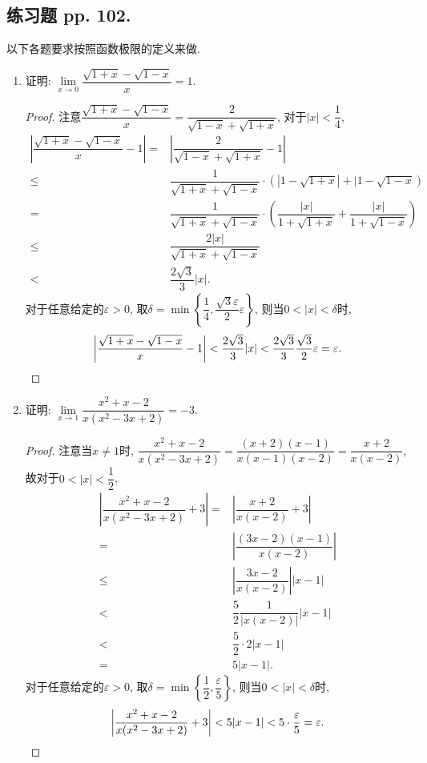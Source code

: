 \documentclass[a4paper,11pt,twoside]{ctexbook}
\begin{document}
\subsection{练习题 pp. 102.}
以下各题要求按照函数极限的定义来做.
\begin{enumerate}
	\item 证明: $\lim\limits_{x\to 0} \dfrac{\sqrt{1+x}-\sqrt{1-x}}{x}=1$.
	      \begin{proof}
		      注意$\dfrac{\sqrt{1+x}-\sqrt{1-x}}{x}=\dfrac{2}{\sqrt{1-x}+\sqrt{1+x}}$, 对于$|x|<\dfrac{1}{4}$,
		      \[
			      \begin{split}
				      \left| \dfrac{\sqrt{1+x}-\sqrt{1-x}}{x}-1\right|=&\left|\dfrac{2}{\sqrt{1-x}+\sqrt{1+x}}-1\right|\\
				      \leqslant&\dfrac{1}{\sqrt{1+x}+\sqrt{1-x}}\cdot(|1-\sqrt{1+x}|+|1-\sqrt{1-x})\\
				      =&\dfrac{1}{\sqrt{1+x}+\sqrt{1-x}}\cdot\left(\dfrac{|x|}{1+\sqrt{1+x}}+\dfrac{|x|}{1+\sqrt{1-x}}\right)\\
				      \leqslant&\dfrac{2|x|}{\sqrt{1+x}+\sqrt{1-x}}\\
				      <&\dfrac{2\sqrt{3}}{3}|x|.
			      \end{split}
		      \]
		      对于任意给定的$\varepsilon>0$, 取$\delta=\min\left\{\dfrac{1}{4}, \dfrac{\sqrt{3}\varepsilon}{2}\varepsilon\right\}$, 则当$0<|x|<\delta$时,
		      \[
			      \left| \dfrac{\sqrt{1+x}-\sqrt{1-x}}{x}-1\right|<\dfrac{2\sqrt{3}}{3}|x|<\dfrac{2\sqrt{3}}{3}\dfrac{\sqrt{3}}{2}\varepsilon=\varepsilon. \qedhere
		      \]
	      \end{proof}

	\item 证明: $\lim\limits_{x\to 1} \dfrac{x^2+x-2}{x(x^2-3x+2)}=-3$.
	      \begin{proof}
		      注意当$x\neq 1$时, $\dfrac{x^2+x-2}{x(x^2-3x+2)}=\dfrac{(x+2)(x-1)}{x(x-1)(x-2)}=\dfrac{x+2}{x(x-2)}$, 故对于$0<|x|<\dfrac{1}{2}$,
		      \[
			      \begin{split}
				      \left|\dfrac{x^2+x-2}{x(x^2-3x+2)}+3\right|=&\left|\dfrac{x+2}{x(x-2)}+3\right|\\
				      =&\left|\dfrac{(3x-2)(x-1)}{x(x-2)}\right|\\
				      \leqslant& \left|\dfrac{3x-2}{x(x-2)}\right||x-1|\\
				      <&\dfrac{5}{2}\dfrac{1}{|x(x-2)|}|x-1|\\
				      <&\dfrac{5}{2}\cdot 2|x-1|\\
				      =&5|x-1|.
			      \end{split}
		      \]
		      对于任意给定的$\varepsilon>0$, 取$\delta=\min\left\{\dfrac{1}{2}, \dfrac{\varepsilon}{5}\right\}$, 则当$0<|x|<\delta$时,
		      \[
			      \left|\dfrac{x^2+x-2}{x(x^2-3x+2)}+3\right|<5|x-1|<5\cdot\dfrac{\varepsilon}{5}=\varepsilon. \qedhere
		      \]
	      \end{proof}


\end{enumerate}
\end{document}
